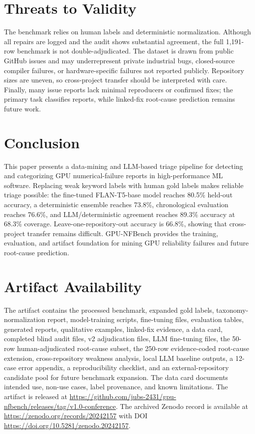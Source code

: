 \documentclass[conference]{IEEEtran}
\newcommand{\bench}{GPU-NFBench}
\begin{document}
\section{Threats to Validity}

The benchmark relies on human labels and deterministic normalization. Although
all repairs are logged and the audit shows substantial agreement, the full
1,191-row benchmark is not double-adjudicated. The dataset is drawn from public
GitHub issues and may underrepresent private industrial bugs, closed-source
compiler failures, or hardware-specific failures not reported publicly.
Repository sizes are uneven, so cross-project transfer should be interpreted
with care. Finally, many issue reports lack minimal reproducers or confirmed
fixes; the primary task classifies reports, while linked-fix root-cause
prediction remains future work.

\section{Conclusion}

This paper presents a data-mining and LLM-based triage pipeline for detecting
and categorizing GPU numerical-failure reports in high-performance ML software.
Replacing weak keyword labels with human gold labels makes reliable triage
possible: the fine-tuned FLAN-T5-base model reaches 80.5\% held-out accuracy,
a deterministic ensemble reaches 73.8\%, chronological evaluation reaches
76.6\%, and LLM/deterministic agreement reaches 89.3\% accuracy at 68.3\%
coverage. Leave-one-repository-out accuracy is 66.8\%, showing that
cross-project transfer remains difficult. \bench{} provides the training,
evaluation, and artifact foundation for mining GPU reliability failures and
future root-cause prediction.

\section*{Artifact Availability}

The artifact contains the processed benchmark, expanded gold labels,
taxonomy-normalization report, model-training scripts, fine-tuning files,
evaluation tables, generated reports, qualitative examples, linked-fix evidence,
a data card, completed blind audit files, v2 adjudication files, LLM fine-tuning
files, the 50-row human-adjudicated root-cause subset, the 250-row
evidence-coded root-cause extension, cross-repository weakness analysis, local
LLM baseline outputs, a 12-case error appendix, a reproducibility checklist,
and an external-repository candidate pool for future benchmark expansion. The
data card documents intended use, non-use cases, label provenance, and known
limitations. The artifact is released at
\url{https://github.com/jubs-2431/gpu-nfbench/releases/tag/v1.0-conference}.
The archived Zenodo record is available at
\url{https://zenodo.org/records/20242157} with DOI
\url{https://doi.org/10.5281/zenodo.20242157}.
\end{document}
